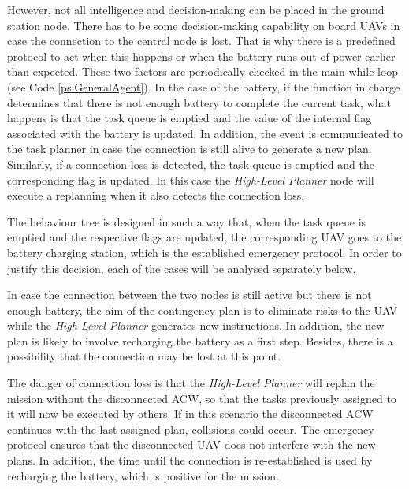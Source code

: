 \documentclass[fontsize=11pt, English=false, Español=true, Myfinal=true, twoside, numbers=noenddot]{scrbook}
\begin{document}
{However, not all intelligence and decision-making can be placed in the ground station node. There has to be some decision-making capability on board \glspl{UAV} in case the connection to the central node is lost. That is why there is a predefined protocol to act when this happens or when the battery runs out of power earlier than expected. These two factors are periodically checked in the main while loop (see Code \ref{ps:GeneralAgent}). In the case of the battery, if the function in charge determines that there is not enough battery to complete the current task, what happens is that the task queue is emptied and the value of the internal flag associated with the battery is updated. In addition, the event is communicated to the task planner in case the connection is still alive to generate a new plan. Similarly, if a connection loss is detected, the task queue is emptied and the corresponding flag is updated. In this case the \emph{High-Level Planner} node will execute a replanning when it also detects the connection loss.

The behaviour tree is designed in such a way that, when the task queue is emptied and the respective flags are updated, the corresponding \gls{UAV} goes to the battery charging station, which is the established emergency protocol. In order to justify this decision, each of the cases will be analysed separately below.

In case the connection between the two nodes is still active but there is not enough battery, the aim of the contingency plan is to eliminate risks to the \gls{UAV} while the \emph{High-Level Planner} generates new instructions. In addition, the new plan is likely to involve recharging the battery as a first step. Besides, there is a possibility that the connection may be lost at this point.

The danger of connection loss is that the \emph{High-Level Planner} will replan the mission without the disconnected \gls{ACW}, so that the tasks previously assigned to it will now be executed by others. If in this scenario the disconnected \gls{ACW} continues with the last assigned plan, collisions could occur. The emergency protocol ensures that the disconnected \gls{UAV} does not interfere with the new plans. In addition, the time until the connection is re-established is used by recharging the battery, which is positive for the mission.


}
\end{document}
